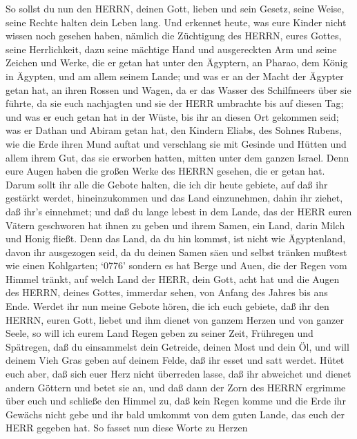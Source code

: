  So sollst du nun den HERRN, deinen Gott, lieben und sein
Gesetz, seine Weise, seine Rechte halten dein Leben lang. 
Und erkennet heute, was eure Kinder nicht wissen noch gesehen haben,
nämlich die Züchtigung des HERRN, eures Gottes, seine Herrlichkeit, dazu
seine mächtige Hand und ausgereckten Arm  und seine Zeichen
und Werke, die er getan hat unter den Ägyptern, an Pharao, dem König in
Ägypten, und am allem seinem Lande;  und was er an der Macht
der Ägypter getan hat, an ihren Rossen und Wagen, da er das Wasser des
Schilfmeers über sie führte, da sie euch nachjagten und sie der HERR
umbrachte bis auf diesen Tag;  und was er euch getan hat in
der Wüste, bis ihr an diesen Ort gekommen seid;  was er
Dathan und Abiram getan hat, den Kindern Eliabs, des Sohnes Rubens, wie
die Erde ihren Mund auftat und verschlang sie mit Gesinde und Hütten und
allem ihrem Gut, das sie erworben hatten, mitten unter dem ganzen
Israel.  Denn eure Augen haben die großen Werke des HERRN
gesehen, die er getan hat.  Darum sollt ihr alle die Gebote
halten, die ich dir heute gebiete, auf daß ihr gestärkt werdet,
hineinzukommen und das Land einzunehmen, dahin ihr ziehet, daß ihr's
einnehmet;  und daß du lange lebest in dem Lande, das der
HERR euren Vätern geschworen hat ihnen zu geben und ihrem Samen, ein
Land, darin Milch und Honig fließt.  Denn das Land, da du
hin kommst, ist nicht wie Ägyptenland, davon ihr ausgezogen seid, da du
deinen Samen säen und selbst tränken mußtest wie einen Kohlgarten;
 `0776' sondern es hat Berge und Auen, die der Regen vom
Himmel tränkt,  auf welch Land der HERR, dein Gott, acht
hat und die Augen des HERRN, deines Gottes, immerdar sehen, von Anfang
des Jahres bis ans Ende.  Werdet ihr nun meine Gebote
hören, die ich euch gebiete, daß ihr den HERRN, euren Gott, liebet und
ihm dienet von ganzem Herzen und von ganzer Seele,  so will
ich eurem Land Regen geben zu seiner Zeit, Frühregen und Spätregen, daß
du einsammelst dein Getreide, deinen Most und dein Öl,  und
will deinem Vieh Gras geben auf deinem Felde, daß ihr esset und satt
werdet.  Hütet euch aber, daß sich euer Herz nicht
überreden lasse, daß ihr abweichet und dienet andern Göttern und betet
sie an,  und daß dann der Zorn des HERRN ergrimme über euch
und schließe den Himmel zu, daß kein Regen komme und die Erde ihr
Gewächs nicht gebe und ihr bald umkommt von dem guten Lande, das euch
der HERR gegeben hat.  So fasset nun diese Worte zu Herzen
